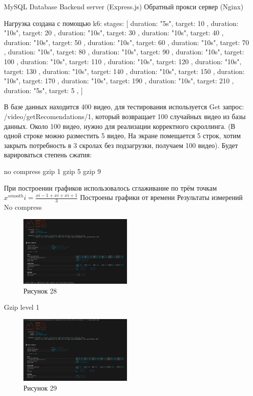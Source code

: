 \documentclass[12pt]{article}
\begin{document}
    MySQL Database
    Backend server (Express.js)
    Обратный прокси сервер (Nginx)

    Нагрузка создана с помощью k6:
    stages: [
    { duration: "5s", target: 10 },
    { duration: "10s", target: 20 },
    { duration: "10s", target: 30 },
    { duration: "10s", target: 40 },
    { duration: "10s", target: 50 },
    { duration: "10s", target: 60 },
    { duration: "10s", target: 70 },
    { duration: "10s", target: 80 },
    { duration: "10s", target: 90 },
    { duration: "10s", target: 100 },
    { duration: "10s", target: 110 },
    { duration: "10s", target: 120 },
    { duration: "10s", target: 130 },
    { duration: "10s", target: 140 },
    { duration: "10s", target: 150 },
    { duration: "10s", target: 170 },
    { duration: "10s", target: 190 },
    { duration: "10s", target: 210 },
    { duration: "5s", target: 5 },
    ]

    В базе данных находится 400 видео, для тестирования используется Get запрос:
    /video/getRecomendations/1, который возвращает 100 случайных видео из базы данных. Около 100 видео, нужно для реализации корректного
    скроллинга. (В одной строке можно разместить 5 видео, На экране помещается 5 строк, хотим закрыть
    потребность в 3 скролах без подзагрузки, получаем 100 видео).
    Будет варироваться степень сжатия:

    no compress
    gzip 1
    gzip 5
    gzip 9

    При построении графиков использовалось сглаживание по трём точкам
$x^{smooth}{i} = \frac{x{i-1} + x{i} + x{i+1}}{3}$
    Построены графики от времени
    Результаты измерений
    No compress
    \begin{figure}[h!]
        \centering
        \includegraphics[width=0.5\textwidth]{../images/second_part/no_compress_screenshot.png}
        \caption{Рисунок 28}
    \end{figure}

    Gzip level 1
    \begin{figure}[h!]
        \centering
        \includegraphics[width=0.5\textwidth]{../images/second_part/gzip1_screenshot.png}
        \caption{Рисунок 29}
    \end{figure}
\end{document}
